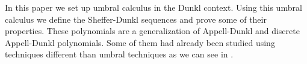 \documentclass[11pt]{article}
\theoremstyle{plain}
\theoremstyle{remark}
\numberwithin{equation}{section} %
\newcommand{\Ea}{E_{\alpha}}
\newcommand{\La}{\Lambda_{\alpha}}
\newcommand{\I}{\mathcal{I}}
\begin{document}



In this paper we set up umbral calculus in the Dunkl context. Using this umbral calculus we define the Sheffer-Dunkl sequences and prove some of their properties. These polynomials are a generalization of Appell-Dunkl and discrete Appell-Dunkl polynomials. Some of them had already been studied using techniques different than umbral techniques as we can see in \cite{CDPV, CMV, DPV, ELMV, GLMV, JMC, MV,Ros}.
\end{document}
